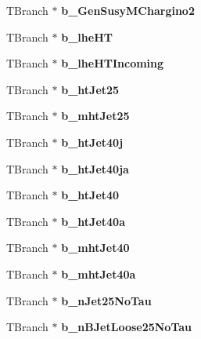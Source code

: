 \begin{DoxyCompactItemize}
T\+Branch $\ast$ {\bfseries b\+\_\+\+Gen\+Susy\+M\+Chargino2}
\item 
\hypertarget{classMiniTree_a5b7c7ebdf0c2cf1475f2984d8d4758cb}{}\label{classMiniTree_a5b7c7ebdf0c2cf1475f2984d8d4758cb} 
T\+Branch $\ast$ {\bfseries b\+\_\+lhe\+HT}
\item 
\hypertarget{classMiniTree_ab3ccea0055a8431f439e39c61bc8a5fb}{}\label{classMiniTree_ab3ccea0055a8431f439e39c61bc8a5fb} 
T\+Branch $\ast$ {\bfseries b\+\_\+lhe\+H\+T\+Incoming}
\item 
\hypertarget{classMiniTree_ae8ceb71825302ee0088a6d90cbef0969}{}\label{classMiniTree_ae8ceb71825302ee0088a6d90cbef0969} 
T\+Branch $\ast$ {\bfseries b\+\_\+ht\+Jet25}
\item 
\hypertarget{classMiniTree_a16688c74b1f288ccf8f3fe95c6842300}{}\label{classMiniTree_a16688c74b1f288ccf8f3fe95c6842300} 
T\+Branch $\ast$ {\bfseries b\+\_\+mht\+Jet25}
\item 
\hypertarget{classMiniTree_acdb8a95a5a9840bc2ab9681672e5ab97}{}\label{classMiniTree_acdb8a95a5a9840bc2ab9681672e5ab97} 
T\+Branch $\ast$ {\bfseries b\+\_\+ht\+Jet40j}
\item 
\hypertarget{classMiniTree_a3f80b2cf676373d22a54197f22b61677}{}\label{classMiniTree_a3f80b2cf676373d22a54197f22b61677} 
T\+Branch $\ast$ {\bfseries b\+\_\+ht\+Jet40ja}
\item 
\hypertarget{classMiniTree_a0eb379897062d00b7bdde523a18d71a5}{}\label{classMiniTree_a0eb379897062d00b7bdde523a18d71a5} 
T\+Branch $\ast$ {\bfseries b\+\_\+ht\+Jet40}
\item 
\hypertarget{classMiniTree_a386ec80b315ad1d1e6cb996a942722e7}{}\label{classMiniTree_a386ec80b315ad1d1e6cb996a942722e7} 
T\+Branch $\ast$ {\bfseries b\+\_\+ht\+Jet40a}
\item 
\hypertarget{classMiniTree_a8266fa523c214581344d24f689457e07}{}\label{classMiniTree_a8266fa523c214581344d24f689457e07} 
T\+Branch $\ast$ {\bfseries b\+\_\+mht\+Jet40}
\item 
\hypertarget{classMiniTree_a11e67b773e58654e036c082780cb99b1}{}\label{classMiniTree_a11e67b773e58654e036c082780cb99b1} 
T\+Branch $\ast$ {\bfseries b\+\_\+mht\+Jet40a}
\item 
\hypertarget{classMiniTree_ad5d64043ccd75b1e5c8e0a469faaec09}{}\label{classMiniTree_ad5d64043ccd75b1e5c8e0a469faaec09} 
T\+Branch $\ast$ {\bfseries b\+\_\+n\+Jet25\+No\+Tau}
\item 
\hypertarget{classMiniTree_ac54f318f4243eda6c7e493b07d47b722}{}\label{classMiniTree_ac54f318f4243eda6c7e493b07d47b722} 
T\+Branch $\ast$ {\bfseries b\+\_\+n\+B\+Jet\+Loose25\+No\+Tau}

\end{DoxyCompactItemize}

